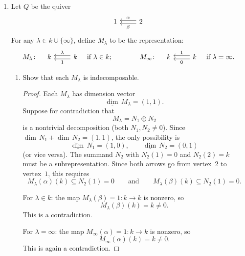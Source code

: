 \documentclass[11pt, a4paper]{article}
\begin{document}
\begin{enumerate}[leftmargin=*, label=\textbf{\arabic*.}]
\begin{enumerate}[label=(\alph*)]
\begin{proof}
    Therefore
    \[
    0 \longrightarrow M' \xrightarrow{\;\iota\;} M \xrightarrow{\;p\;} M'' \longrightarrow 0
    \]
    is a short exact sequence.
    \end{proof}
\end{enumerate}

\item Let $Q$ be the quiver
\[
\begin{tikzcd}
1 & 2 \arrow[l, "\alpha"', shift right] \arrow[l, "\beta", shift left]
\end{tikzcd}
\]
For any $\lambda \in k \cup \{\infty\}$, define $M_\lambda$ to be the representation:
\[
M_\lambda\colon\quad
\begin{tikzcd}
k & k \arrow[l, "\lambda"', shift right] \arrow[l, "1", shift left]
\end{tikzcd}
\quad \text{if } \lambda \in k;
\qquad\qquad
M_\infty\colon\quad
\begin{tikzcd}
k & k \arrow[l, "1"', shift right] \arrow[l, "0", shift left]
\end{tikzcd}
\quad \text{if } \lambda = \infty.
\]
\begin{enumerate}[label=(\alph*)]
    \item Show that each $M_\lambda$ is indecomposable.
    \begin{proof}
    Each $M_\lambda$ has dimension vector
    \[
    \underline{\dim}\,M_\lambda = (1,1).
    \]
    Suppose for contradiction that
    \[
    M_\lambda = N_1 \oplus N_2
    \]
    is a nontrivial decomposition (both $N_1,N_2\neq 0$). Since $\underline{\dim}\,N_1 + \underline{\dim}\,N_2 = (1,1)$, the only possibility is
    \[
    \underline{\dim}\,N_1 = (1,0),\qquad \underline{\dim}\,N_2 = (0,1)
    \]
    (or vice versa). The summand $N_2$ with $N_2(1)=0$ and $N_2(2)=k$ must be a subrepresentation. Since both arrows go from vertex~$2$ to vertex~$1$, this requires
    \[
    M_\lambda(\alpha)(k) \subseteq N_2(1) = 0 \qquad\text{and}\qquad M_\lambda(\beta)(k) \subseteq N_2(1) = 0.
    \]

    For $\lambda\in k$: the map $M_\lambda(\beta)=1\colon k\to k$ is nonzero, so
    \[
    M_\lambda(\beta)(k) = k \neq 0.
    \]
    This is a contradiction.

    For $\lambda=\infty$: the map $M_\infty(\alpha)=1\colon k\to k$ is nonzero, so
    \[
    M_\infty(\alpha)(k) = k \neq 0.
    \]
    This is again a contradiction.


\end{proof}
\end{enumerate}
\end{enumerate}
\end{document}
